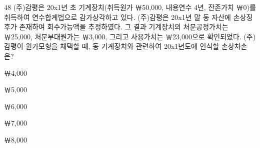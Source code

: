 \begin{question}{48}
(주)감평은 20x1년 초 기계장치(취득원가 ￦50,000, 내용연수 4년, 잔존가치 ￦0)를 취득하여 연수합계법으로 감가상각하고 있다. (주)감평은 20x1년 말 동 자산에 손상징후가 존재하여 회수가능액을 추정하였다. 그 결과 기계장치의 처분공정가치는 ￦25,000, 처분부대원가는 ￦3,000, 그리고 사용가치는 ￦23,000으로 확인되었다. (주)감평이 원가모형을 채택할 때, 동 기계장치와 관련하여 20x1년도에 인식할 손상차손은?
\begin{choices}
  \item ￦4,000
  \item ￦5,000
  \item ￦6,000
  \item ￦7,000
  \item ￦8,000
\end{choices}
\end{question}

